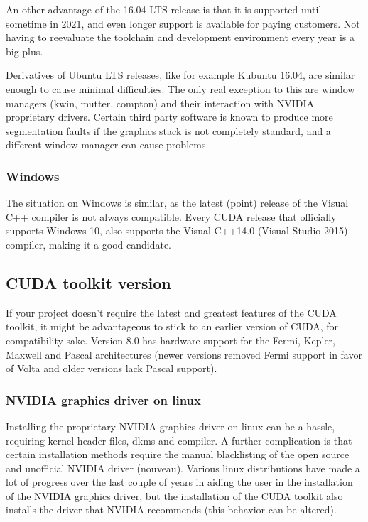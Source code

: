 An other advantage of the 16.04 LTS release is that it is supported until sometime in 2021, and even longer support is available for paying customers. Not having to reevaluate the toolchain and development environment every year is a big plus.

\newpage

Derivatives of Ubuntu LTS releases, like for example Kubuntu 16.04, are similar enough to cause minimal difficulties. The only real exception to this are window managers (kwin, mutter, compton) and their interaction with NVIDIA proprietary drivers. Certain third party software is known to produce more segmentation faults if the graphics stack is not completely standard, and a different window manager can cause problems.

\subsubsection*{Windows}

\hspace{4mm}The situation on Windows is similar, as the latest (point) release of the Visual C++ compiler is not always compatible. Every CUDA release that officially supports Windows 10, also supports the Visual C++14.0 (Visual Studio 2015) compiler, making it a good candidate.

\subsection*{CUDA toolkit version}

\hspace{4mm}If your project doesn't require the latest and greatest features of the CUDA toolkit, it might be advantageous to stick to an earlier version of CUDA, for compatibility sake. Version 8.0 has hardware support for the Fermi, Kepler, Maxwell and Pascal architectures (newer versions removed Fermi support in favor of Volta and older versions lack Pascal support).

\subsubsection*{NVIDIA graphics driver on linux}

\hspace{4mm}Installing the proprietary NVIDIA graphics driver on linux can be a hassle, requiring kernel header files, dkms and compiler. A further complication is that certain installation methods require the manual blacklisting of the open source and unofficial NVIDIA driver (nouveau). Various linux distributions have made a lot of progress over the last couple of years in aiding the user in the installation of the NVIDIA graphics driver, but the installation of the CUDA toolkit also installs the driver that NVIDIA recommends (this behavior can be altered).\vspace{5mm}

